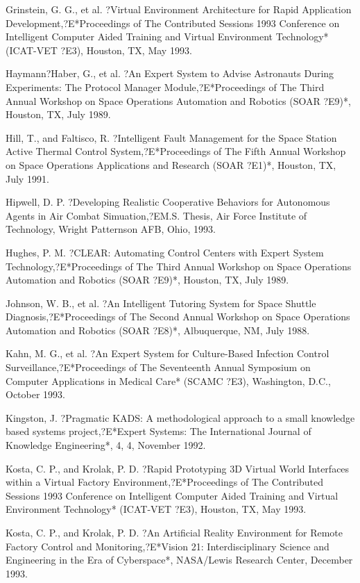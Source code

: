 \documentclass[letterpaper,10pt,english]{sphinxmanual}
\begin{document}
Grinstein, G. G., et al. ?Virtual Environment Architecture for Rapid
Application Development,?E*Proceedings of The Contributed Sessions 1993
Conference on Intelligent Computer Aided Training and Virtual
Environment Technology* (ICAT-VET ?E3), Houston, TX, May 1993.

Haymann?Haber, G., et al. ?An Expert System to Advise Astronauts During
Experiments: The Protocol Manager Module,?E*Proceedings of The Third
Annual Workshop on Space Operations Automation and Robotics (SOAR ?E9)*,
Houston, TX, July 1989.

Hill, T., and Faltisco, R. ?Intelligent Fault Management for the Space
Station Active Thermal Control System,?E*Proceedings of The Fifth Annual
Workshop on Space Operations Applications and Research (SOAR ?E1)*,
Houston, TX, July 1991.

Hipwell, D. P. ?Developing Realistic Cooperative Behaviors for
Autonomous Agents in Air Combat Simuation,?EM.S. Thesis, Air Force
Institute of Technology, Wright Patternson AFB, Ohio, 1993.

Hughes, P. M. ?CLEAR: Automating Control Centers with Expert System
Technology,?E*Proceedings of The Third Annual Workshop on Space
Operations Automation and Robotics (SOAR ?E9)*, Houston, TX, July 1989.

Johnson, W. B., et al. ?An Intelligent Tutoring System for Space Shuttle
Diagnosis,?E*Proceedings of The Second Annual Workshop on Space
Operations Automation and Robotics (SOAR ?E8)*, Albuquerque, NM, July
1988.

Kahn, M. G., et al. ?An Expert System for Culture-Based Infection
Control Surveillance,?E*Proceedings of The Seventeenth Annual Symposium
on Computer Applications in Medical Care* (SCAMC ?E3), Washington, D.C.,
October 1993.

Kingston, J. ?Pragmatic KADS: A methodological approach to a small
knowledge based systems project,?E*Expert Systems: The International
Journal of Knowledge Engineering*, 4, 4, November 1992.

Kosta, C. P., and Krolak, P. D. ?Rapid Prototyping 3D Virtual World
Interfaces within a Virtual Factory Environment,?E*Proceedings of The
Contributed Sessions 1993 Conference on Intelligent Computer Aided
Training and Virtual Environment Technology* (ICAT-VET ?E3), Houston,
TX, May 1993.

Kosta, C. P., and Krolak, P. D. ?An Artificial Reality Environment for
Remote Factory Control and Monitoring,?E*Vision 21: Interdisciplinary
Science and Engineering in the Era of Cyberspace*, NASA/Lewis Research
Center, December 1993.
\end{document}
